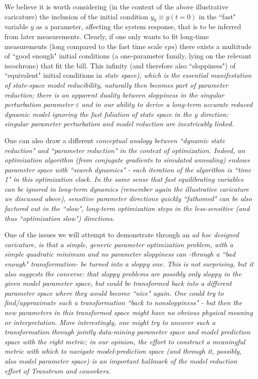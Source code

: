 \documentclass{article}
\newcommand{\eps}{\varepsilon}
\begin{document}
We believe it is worth considering (in the context of the above illustrative caricature) the inclusion of the
initial condition $y_0 \equiv y(t=0)$ in the ``fast" variable $y$ as a parameter, affecting the system response, that is
to be inferred from later measurements.
%
Clearly, if one only wants to fit long-time measurements (long compared to the fast time scale $eps$) there exists a multitude of ``good enough" initial conditions (a one-parameter family, lying on the relevant iscochrone) that fit the bill.
%
This infinity (and therefore also ``sloppiness") of ``equivalent" initial conditions in \em{state space}), which is the
essential manifestation of state-space model reducibility, naturally then becomes part of \em{parameter reduction};
there is an apparent duality between sloppiness in the singular perturbation parameter $\eps$ and in our
ability to derive a long-term accurate reduced dynamic model ignoring the fast foliation of state space in the 
$y$ direction: singular parameter perturbation and model reduction are inextricably linked.
%

One can also draw a different \em{conceptual} analogy between ``dynamic state reduction" and ``parameter reduction" in the
context of optimization. 
%
Indeed, an optimization algorithm (from conjugate gradients to simulated annealing)
endows parameter space with ``search dynamics" - each iteration of the algorithm is ``time 1" in this
optimization clock. 
%
In the same sense that fast equilibrating variables can be ignored in long-term dynamics (remember again
the illustrative caricature we discussed above), sensitive parameter directions quickly ``fathomed" can
be also factored out in the ``slow", long-term optimization steps in the less-sensitive (and thus
``optimization slow") directions.
%
%

One of the issues we will attempt to demonstrate through an \em{ad hoc} designed caricature, is that a
simple, generic parameter optimization problem, with a simple quadratic minimum and no parameter sloppiness
can -through a ``bad enough" transformation- be turned into a sloppy one.
%
This is not surprising, but it also suggests the converse: that sloppy problems are possibly only sloppy
in the given model parameter space, but could be transformed back into a different parameter space where
they would become ``nice" again.
%
One could try to find/approximate such a transformation ``back to nonsloppiness" - but then the new parameters
in this transformed space might have no obvious physical meaning or interpretation. 
%
More interestingly, one might try to uncover such a transformation through jointly data-mining parameter
space and model prediction space \em{with the right metric}; in our opinion, the effort to construct a meaningful
metric with which to navigate model-prediction space (and through it, possibly, also model parameter space)
is an important hallmark of the model reduction effort of Transtrum and coworkers.
\end{document}
